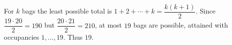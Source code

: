 For $k$ bags the least possible total is $1+2+\cdots+k=\dfrac{k(k+1)}{2}$. Since $\dfrac{19\cdot20}{2}=190$ but $\dfrac{20\cdot21}{2}=210$, at most $19$ bags are possible, attained with occupancies $1,\ldots,19$. Thus $\boxed{19}$.
